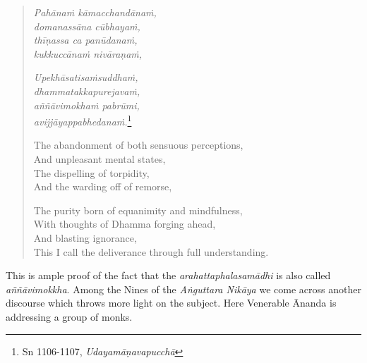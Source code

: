 \begin{quote}
\emph{Pahānaṁ kāmacchandānaṁ,}\\
\emph{domanassāna cūbhayaṁ,}\\
\emph{thīṇassa ca panūdanaṁ,}\\
\emph{kukkuccānaṁ nivāraṇaṁ,}

\emph{Upekhāsatisaṁsuddhaṁ,}\\
\emph{dhammatakkapurejavaṁ,}\\
\emph{aññāvimokhaṁ pabrūmi,}\\
\emph{avijjāyappabhedanaṁ.}\footnote{Sn 1106-1107, \emph{Udayamāṇavapucchā}}

The abandonment of both sensuous perceptions,\\
And unpleasant mental states,\\
The dispelling of torpidity,\\
And the warding off of remorse,

The purity born of equanimity and mindfulness,\\
With thoughts of Dhamma forging ahead,\\
And blasting ignorance,\\
This I call the deliverance through full understanding.
\end{quote}

This is ample proof of the fact that the \emph{arahattaphalasamādhi} is also called \emph{aññāvimokkha}. Among the Nines of the \emph{Aṅguttara Nikāya} we come across another discourse which throws more light on the subject. Here Venerable Ānanda is addressing a group of monks.

